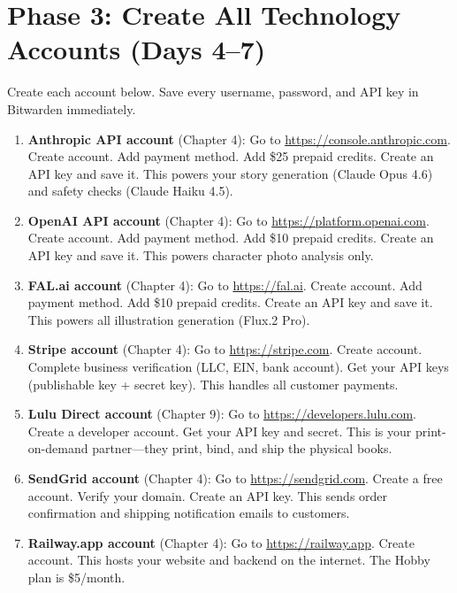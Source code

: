 \documentclass[12pt, letterpaper, oneside]{book}
\begin{document}
\section{Phase 3: Create All Technology Accounts (Days 4--7)}

Create each account below. Save every username, password, and API key in Bitwarden immediately.

\begin{enumerate}[leftmargin=2em, itemsep=6pt, start=7]
  \item \textbf{Anthropic API account} (Chapter 4): Go to \url{https://console.anthropic.com}. Create account. Add payment method. Add \$25 prepaid credits. Create an API key and save it. This powers your story generation (Claude Opus 4.6) and safety checks (Claude Haiku 4.5).

  \item \textbf{OpenAI API account} (Chapter 4): Go to \url{https://platform.openai.com}. Create account. Add payment method. Add \$10 prepaid credits. Create an API key and save it. This powers character photo analysis only.

  \item \textbf{FAL.ai account} (Chapter 4): Go to \url{https://fal.ai}. Create account. Add payment method. Add \$10 prepaid credits. Create an API key and save it. This powers all illustration generation (Flux.2 Pro).

  \item \textbf{Stripe account} (Chapter 4): Go to \url{https://stripe.com}. Create account. Complete business verification (LLC, EIN, bank account). Get your API keys (publishable key + secret key). This handles all customer payments.

  \item \textbf{Lulu Direct account} (Chapter 9): Go to \url{https://developers.lulu.com}. Create a developer account. Get your API key and secret. This is your print-on-demand partner---they print, bind, and ship the physical books.

  \item \textbf{SendGrid account} (Chapter 4): Go to \url{https://sendgrid.com}. Create a free account. Verify your domain. Create an API key. This sends order confirmation and shipping notification emails to customers.

  \item \textbf{Railway.app account} (Chapter 4): Go to \url{https://railway.app}. Create account. This hosts your website and backend on the internet. The Hobby plan is \$5/month.
\end{enumerate}
\end{document}
